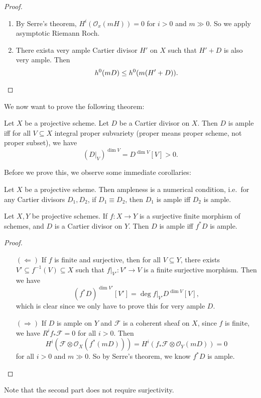 \documentclass[a4paper]{article}
\begin{document}
\begin{proof}\leavevmode
  \begin{enumerate}
    \item By Serre's theorem, $H^i(\mathcal{O}_x(mH)) = 0$ for $i > 0$ and $m \gg 0$. So we apply asymptotic Riemann Roch.
    \item There exista very ample Cartier divisor $H'$ on $X$ such that $H' + D$ is also very ample. Then
      \[
        h^0(mD) \leq h^0(m (H' + D)).\qedhere
      \]%
  \end{enumerate}
\end{proof}

We now want to prove the following theorem:
\begin{thm}
  Let $X$ be a projective scheme. Let $D$ be a Cartier divisor on $X$. Then $D$ is ample iff for all $V \subseteq X$ integral proper subvariety (proper means proper scheme, not proper subset), we have
  \[
    (D|_V)^{\dim V} = D^{\dim V} [V] > 0.
  \]
\end{thm}

Before we prove this, we observe some immediate corollaries:
\begin{cor}
  Let $X$ be a projective scheme. Then ampleness is a numerical condition, i.e.\ for any Cartier divisors $D_1, D_2$, if $D_1 \equiv D_2$, then $D_1$ is ample iff $D_2$ is ample.
\end{cor}

\begin{cor}
  Let $X, Y$ be projective schemes. If $f: X \to Y$ is a surjective finite morphism of schemes, and $D$ is a Cartier divisor on $Y$. Then $D$ is ample iff $f^*D$ is ample.
\end{cor}

\begin{proof}\leavevmode
  \begin{itemize}
    \item[$(\Leftarrow)$] If $f$ is finite and surjective, then for all $V \subseteq Y$, there exists $V' \subseteq f^{-1}(V) \subseteq X$ such that $f|_{V'}: V' \to V$ is a finite surjective morphism. Then we have
      \[
        (f^* D)^{\dim V'} [V'] = \deg f|_{V'} D^{\dim V} [V],
      \]
      which is clear since we only have to prove this for very ample $D$.
    \item[$(\Rightarrow)$] If $D$ is ample on $Y$ and $\mathcal{F}$ is a coherent sheaf on $X$, since $f$ is finite, we have $R^i f_* \mathcal{F} = 0$ for all $i > 0$. Then
      \[
        H^i(\mathcal{F} \otimes \mathcal{O}_X(f^*(mD))) = H^i(f_* \mathcal{F} \otimes \mathcal{O}_Y(mD)) = 0
      \]
      for all $i > 0$ and $m \gg 0$. So by Serre's theorem, we know $f^* D$ is ample.\qedhere
  \end{itemize}
\end{proof}
Note that the second part does not require surjectivity.
\end{document}
